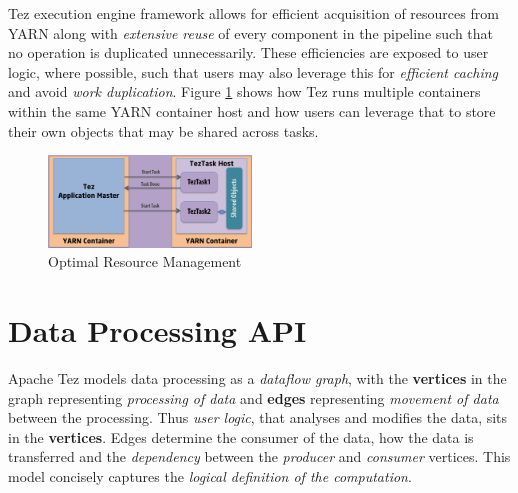 \documentclass[twocolumn]{article}
\begin{document}
Tez execution engine framework allows for efficient acquisition of
resources from YARN along with \emph{extensive reuse} of every component
in the pipeline such that no operation is duplicated unnecessarily.
These efficiencies are exposed to user logic, where possible, such that
users may also leverage this for \emph{efficient caching} and avoid
\emph{work duplication}. Figure \ref{fig06} shows how Tez runs multiple
containers within the same YARN container host and how users can
leverage that to store their own objects that may be shared across
tasks.

\begin{figure}[htb]
        \centering
        \includegraphics[width=0.48\textwidth]{tez4}
        \caption{Optimal Resource Management}
        \label{fig06}
\end{figure}





\section{Data Processing API}

Apache Tez models data processing as a \emph{dataflow graph}, with the
\textbf{vertices} in the graph representing \emph{processing of data}
and \textbf{edges} representing \emph{movement of data} between the
processing. Thus \emph{user logic}, that analyses and modifies the data,
sits in the \textbf{vertices}. Edges determine the consumer of the data,
how the data is transferred and the \emph{dependency} between the
\emph{producer} and \emph{consumer} vertices. This model concisely
captures the \emph{logical definition of the computation}. 
\end{document}
